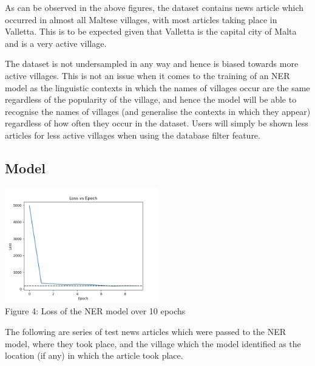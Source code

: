 \documentclass[a4paper, oneside, 11pt]{article}
\begin{document}
\begin{multicols*}{2}
  As can be observed in the above figures, the dataset contains news article which occurred in almost all Maltese villages, with most articles taking place in Valletta. This is to be expected given that Valletta is the capital city of Malta and is a very active village.

  The dataset is not undersampled in any way and hence is biased towards more active villages. This is not an issue when it comes to the training of an NER model as the linguistic contexts in which the names of villages occur are the same regardless of the popularity of the village, and hence the model will be able to recognise the names of villages (and generalise the contexts in which they appear) regardless of how often they occur in the dataset. Users will simply be shown less articles for less active villages when using the database filter feature.


  \subsection{Model}
  \begin{center}
    \includegraphics[width=0.5\textwidth]{./figures/nerloss.png} \\
    Figure 4: Loss of the NER model over 10 epochs
  \end{center}

  The following are series of test news articles which were passed to the NER model, where they took place, and the village which the model identified as the location (if any) in which the article took place.


\end{multicols*}
\end{document}
